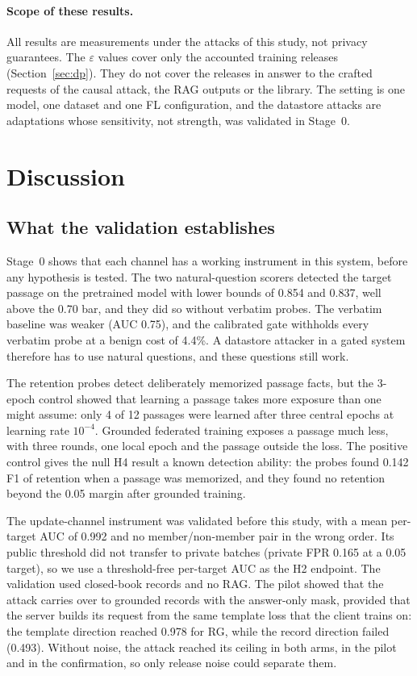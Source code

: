\documentclass[11pt]{article}
\begin{document}
\paragraph{Scope of these results.} All results are measurements under the attacks of this study, not privacy guarantees. The $\varepsilon$ values cover only the accounted training releases (Section~\ref{sec:dp}). They do not cover the releases in answer to the crafted requests of the causal attack, the RAG outputs or the library. The setting is one model, one dataset and one FL configuration, and the datastore attacks are adaptations whose sensitivity, not strength, was validated in Stage~0.

\section{Discussion}\label{sec:analysis}

\subsection{What the validation establishes}\label{sec:readiness}

Stage~0 shows that each channel has a working instrument in this system, before any hypothesis is tested. The two natural-question scorers detected the target passage on the pretrained model with lower bounds of 0.854 and 0.837, well above the 0.70 bar, and they did so without verbatim probes. The verbatim baseline was weaker (AUC 0.75), and the calibrated gate withholds every verbatim probe at a benign cost of 4.4\%. A datastore attacker in a gated system therefore has to use natural questions, and these questions still work.

The retention probes detect deliberately memorized passage facts, but the 3-epoch control showed that learning a passage takes more exposure than one might assume: only 4 of 12 passages were learned after three central epochs at learning rate $10^{-4}$. Grounded federated training exposes a passage much less, with three rounds, one local epoch and the passage outside the loss. The positive control gives the null H4 result a known detection ability: the probes found 0.142 F1 of retention when a passage was memorized, and they found no retention beyond the 0.05 margin after grounded training.

The update-channel instrument was validated before this study, with a mean per-target AUC of 0.992 and no member/non-member pair in the wrong order. Its public threshold did not transfer to private batches (private FPR 0.165 at a 0.05 target), so we use a threshold-free per-target AUC as the H2 endpoint. The validation used closed-book records and no RAG. The pilot showed that the attack carries over to grounded records with the answer-only mask, provided that the server builds its request from the same template loss that the client trains on: the template direction reached 0.978 for RG, while the record direction failed (0.493). Without noise, the attack reached its ceiling in both arms, in the pilot and in the confirmation, so only release noise could separate them.
\end{document}

